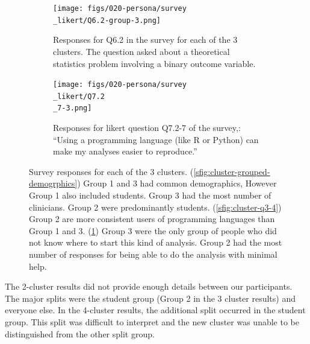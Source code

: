 \documentclass[020-persona\_validation.tex]{subfiles}
\begin{document}
\begin{figure}[htb!]
            \begin{subfigure}[h]{0.45\textwidth}
                \centering
                \texttt{[image: figs/020-persona/survey\\\_likert/Q6.2-group-3.png]}
                \caption[Statistics question for logistic regression (Q6.2) for 3 clusters]
                {Responses for Q6.2 in the survey for each of the 3 clusters.
                    The question asked about a theoretical statistics problem involving a binary outcome variable.
                }
                \label{sfig:cluster-q6-2}
            \end{subfigure}
            \begin{subfigure}[h]{0.45\textwidth}
                \centering
                \texttt{[image: figs/020-persona/survey\\\_likert/Q7.2\\\_7-3.png]}
                \caption[Data programming Q7.2-7 for 3 clusters.]
                {Responses for likert question Q7.2-7 of the survey,:
                    ``Using a programming language (like R or Python) can make my analyses easier to reproduce.''
                }
                \label{sfig:cluster-q7-2-7}
            \end{subfigure}
            \caption[Selected survey questions for 3 clusters]
            {Survey responses for each of the 3 clusters.
                (\ref{sfig:cluster-grouped-demogrphics})
                Group 1 and 3 had common demographics, However Group 1 also included students.
                Group 3 had the most number of clinicians.
                Group 2 were predominantly students.
                (\ref{sfig:cluster-q3-4})
                Group 2 are more consistent users of programming languages than Group 1 and 3.
                (\ref{sfig:cluster-q6-2})
                Group 3 were the only group of people who did not know where to start this kind of analysis.
                Group 2 had the most number of responses for being able to do the analysis with minimal help.
            }
            \label{fig:cluster-results}
        \end{figure}

        The 2-cluster results did not provide enough details between our participants.
        The major splits were the student group (Group 2 in the 3 cluster results) and everyone else.
        In the 4-cluster results,
        the additional split occurred in the student group.
        This split was difficult to interpret and the new cluster was unable to be distinguished from the other split group.
\end{document}
